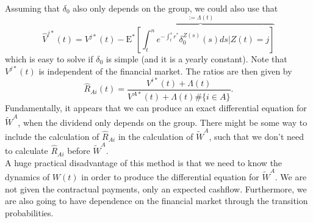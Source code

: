 \documentclass[12pt]{article}
\newcommand{\E}{\text{E}}
\theoremstyle{my_thm}
\begin{document}
Assuming that $\delta_0$ also only depends on the group, we could also use that
$$
\hat{V}^{j*}(t)=V^{j*}(t)- \overbrace{\E^* \left[ \int_t^n e^{-\int_t^s r^*} \delta^{Z(s)}_0(s) ds|Z(t)=j\right]}^{:=\Lambda(t)}
$$
which is easy to solve if $\delta_0$ is simple (and it is a yearly constant). Note that $V^{j*}(t)$ is independent of the financial market. The ratios are then given by
$$
\hat{R}_{Ai}(t)=\frac{V^{i*}(t)+\Lambda(t)}{V^{A*}(t)+ \Lambda(t) \#\{i \in A \} }.
$$
Fundamentally, it appears that we can produce an exact differential equation for $\tilde{W}^A$, when the dividend only depends on the group. There might be some way to include the calculation of $\hat{R}_{Ai}$ in the calculation of $\tilde{W}^A$, such that we don't need to calculate $\hat{R}_{Ai}$ before $\tilde{W}^A$. 
\\[12pt]
A huge practical disadvantage of this method is that we need to know the dynamics of $W(t)$ in order to produce the differential equation for $\tilde{W}^A$. We are not given the contractual payments, only an expected cashflow. Furthermore, we are also going to have dependence on the financial market through the transition probabilities.
\end{document}
